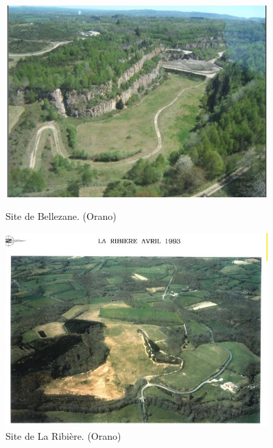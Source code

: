 \documentclass{article}
\begin{document}

\begin{figure}[!ht]
    \centering
    \begin{minipage}{0.5\textwidth}
        \centering
        \includegraphics[width=0.9\textwidth]{I_A_3.jpg} 
        \caption{Site de Bellezane. (Orano)}
        \label{fig:bellezane1}
    \end{minipage}\hfill
    \begin{minipage}{0.5\textwidth}
        \centering
        \includegraphics[width=0.9\textwidth]{I_A_4.jpg} 
        \caption{Site de La Ribière. (Orano)}
        \label{fig:ribiere1}
    \end{minipage}
\end{figure}
\end{document}
